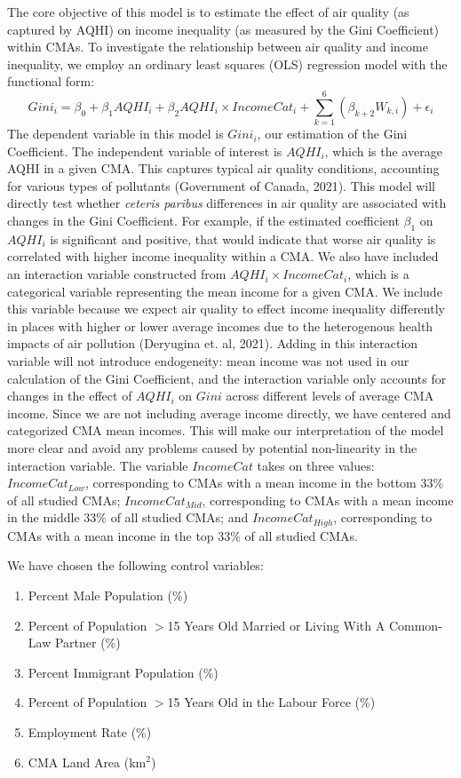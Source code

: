 \documentclass[AEJ]{AEA}
\begin{document}
The core objective of this model is to estimate the effect of air quality (as 
captured by AQHI) on income inequality (as measured by the Gini Coefficient)
within CMAs. To investigate the relationship between air quality and income 
inequality, we employ an ordinary least squares (OLS) regression model with the
functional form:
\begin{equation}
Gini_i=\beta_0+\beta_1 AQHI_i+\beta_2 AQHI_i \times IncomeCat_i
+\sum_{k=1}^{6} \left( \beta_{k+2} W_{k,i} \right)
+ \epsilon_i
\end{equation}
The dependent variable in this model is $Gini_i$, our estimation of the Gini
Coefficient. The independent variable of interest is $AQHI_i$, which is the
average AQHI in a given CMA. This captures typical air quality conditions,
accounting for various types of pollutants (Government of Canada, 2021). This 
model will directly test whether
\emph{ceteris paribus} differences in air quality are associated with changes in
the Gini Coefficient. For example, if the estimated coefficient $\beta_1$ on 
$AQHI_i$ is significant and positive, that would indicate that worse air quality
is correlated with higher income inequality within a CMA. We also have included 
an interaction variable constructed from $AQHI_i \times IncomeCat_i$, which is a 
categorical variable representing the mean income for a given CMA. We include 
this variable because we expect air quality to effect income inequality 
differently in places with higher or lower average incomes due to the heterogenous
health impacts of air pollution (Deryugina et. al, 2021). Adding in this 
interaction variable will not introduce endogeneity: mean income was not used in
our calculation of the Gini Coefficient, and the interaction variable only 
accounts for changes in the effect of $AQHI_i$ on $Gini$ across different
levels of average CMA income. Since we are not including average income directly,
we have centered and categorized CMA mean incomes. This will make our interpretation of 
the model more clear and avoid any problems caused by potential non-linearity in
the interaction variable. The variable $IncomeCat$ takes on three values: $IncomeCat_{Low}$,
corresponding to CMAs with a mean income in the bottom 33\% of all studied CMAs;
$IncomeCat_{Mid}$, corresponding to CMAs with a mean income in the middle 33\% of all
studied CMAs; and $IncomeCat_{High}$, corresponding to CMAs with a mean income in the 
top 33\% of all studied CMAs.

We have chosen the following control variables:
\begin{enumerate}
  \item Percent Male Population (\%)
  \item Percent of Population $>$15 Years Old Married or Living With A 
  Common-Law Partner (\%)
  \item Percent Immigrant Population (\%)
  \item Percent of Population $>$15 Years Old in the Labour Force (\%)
  \item Employment Rate (\%)
  \item CMA Land Area (km$^2$)
\end{enumerate}
\end{document}
